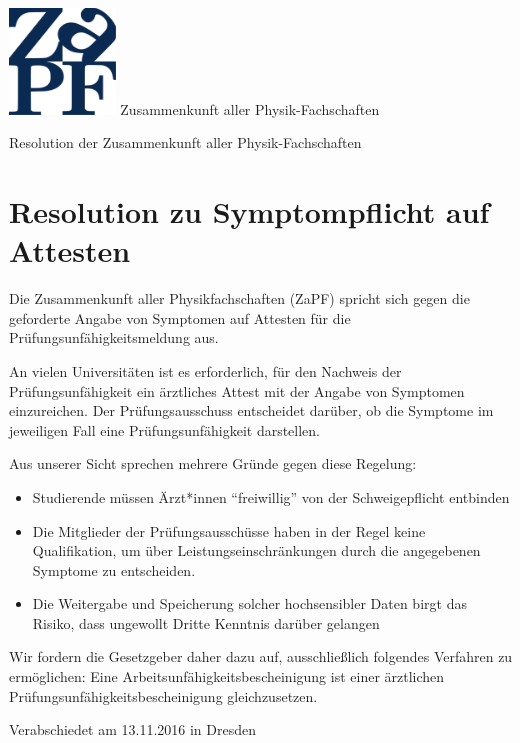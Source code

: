 \documentclass[DIV=calc]{scrartcl}
\begin{document}
\hspace{0.87\textwidth}
\begin{minipage}{120pt}
\vspace{-1.8cm}
\includegraphics[width=80pt]{../../logo.pdf}
\centering
\small Zusammenkunft aller Physik-Fachschaften
\end{minipage}
\begin{center}
\huge{Resolution der Zusammenkunft aller Physik-Fachschaften} \\
\normalsize
\end{center}

\vspace{1cm}
\section*{Resolution zu Symptompflicht auf Attesten}
Die Zusammenkunft aller Physikfachschaften (ZaPF) spricht sich gegen  die geforderte Angabe von Symptomen auf Attesten für die Prüfungsunfähigkeitsmeldung aus. 

An vielen Universitäten ist es erforderlich, für den Nachweis der Prüfungsunfähigkeit ein ärztliches Attest mit der Angabe von Symptomen einzureichen. Der Prüfungsausschuss entscheidet darüber, ob die Symptome im jeweiligen Fall eine Prüfungsunfähigkeit darstellen. 

Aus unserer Sicht sprechen mehrere Gründe gegen diese Regelung: 
\begin{itemize}
\item Studierende müssen Ärzt*innen “freiwillig” von der Schweigepflicht entbinden 
\item Die Mitglieder der Prüfungsausschüsse haben in der Regel keine Qualifikation, um über Leistungseinschränkungen durch die angegebenen Symptome zu entscheiden. 
\item Die Weitergabe und Speicherung solcher hochsensibler Daten birgt das Risiko, dass ungewollt Dritte Kenntnis darüber gelangen 
\end{itemize}

Wir fordern die Gesetzgeber daher dazu auf, ausschließlich folgendes Verfahren zu ermöglichen: 
Eine Arbeitsunfähigkeitsbescheinigung ist einer ärztlichen Prüfungsunfähigkeitsbescheinigung gleichzusetzen.
\vfill
\begin{flushright}
Verabschiedet am 13.11.2016 in Dresden
\end{flushright}
\end{document}
